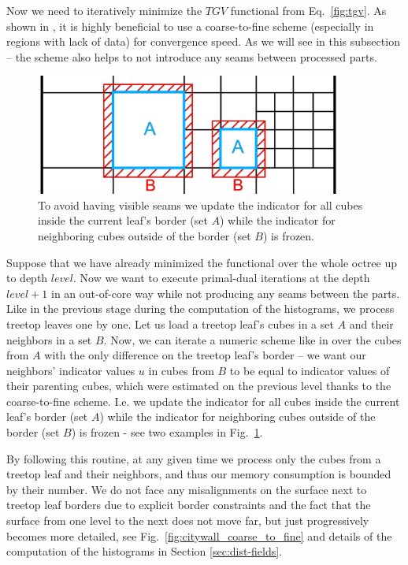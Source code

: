 \documentclass[10pt,twocolumn,letterpaper]{article}
\begin{document}
Now we need to iteratively minimize the $TGV$ functional from Eq.~\ref{fig:tgv}. As shown in \cite{zach2007globally}, it is
highly beneficial to use a coarse-to-fine scheme (especially in regions with lack of data) for convergence speed.
As we will see in this subsection -- the scheme also helps to not introduce any seams between processed parts.

\begin{figure}
    \begin{minipage}[b]{\linewidth}
        \centering
        \capstart
        \includegraphics[width=0.9\textwidth]{images/figures/indicators_fixed_ab_cropped_widest.png}
        \caption{To avoid having visible seams we update the indicator for all cubes inside the current leaf's border (set $A$)
            while the indicator for neighboring cubes outside of the border (set $B$) is frozen.}
        \label{fig:fixed_indicators}
    \end{minipage}
\end{figure}

Suppose that we have already minimized the functional over the whole octree up to depth $level$. Now we want to execute
primal-dual iterations at the depth $level+1$ in an out-of-core way while not producing any seams between the parts. Like in the previous stage during the computation of the histograms,
we process treetop leaves one by one. Let us load a treetop leaf's cubes in a set $A$ and their neighbors
in a set $B$. Now, we can iterate a numeric scheme like in \cite{pock2011tgv} over the cubes from $A$ with the only difference on the treetop leaf's border
-- we want our neighbors' indicator values $u$ in cubes from $B$ to be equal to indicator values of their parenting cubes,
which were estimated on the previous level thanks to the coarse-to-fine scheme.
I.e. we update the indicator for all cubes inside the current leaf's border (set $A$)
while the indicator for neighboring cubes outside of the border (set $B$) is frozen - see two examples in Fig.~\ref{fig:fixed_indicators}.

By following this routine, at any given time we process only the cubes from a treetop leaf and their neighbors, and thus our memory
consumption is bounded by their number. We do not face any misalignments on the surface next to treetop leaf borders due to explicit
border constraints and the fact that the surface from one level to the next does not move far, but just progressively becomes more detailed,
see Fig.~\ref{fig:citywall_coarse_to_fine} and details of the computation of the histograms in Section \ref{sec:dist-fields}.
\end{document}
